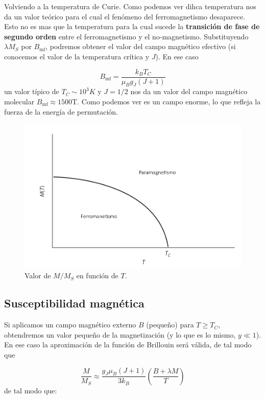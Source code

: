 \documentclass[12pt,a4paper]{book}
\numberwithin{equation}{section}
\numberwithin{figure}{section}
\newcommand{\parentesis}[1]{\left( #1  \right)}
\newcommand{\mf}{\mathrm{mf}}
\begin{document}
Volviendo a la temperatura de Curie. Como podemos ver dihca temperatura nos da un valor teórico para el cual el fenómeno del ferromagnetismo desaparece. Esto no es mas que la temperatura para la cual sucede la \textbf{transición de fase de segundo orden} entre el ferromagnetismo y el no-magnetismo. Substituyendo $\lambda M_S$ por $B_\mf$, podremos obtener el valor del campo magnético efectivo (si conocemos el valor de la temperatura crítica y $J$). En ese caso

\begin{equation}
    B_\mf = \frac{k_B T_C}{\mu_B g_J (J+1)}
\end{equation}
un valor típico de $T_C \sim 10^3K$ y $J=1/2$ nos da un valor del campo magnético molecular $B_\mf \approx 1500$T. Como podemos ver es un campo enorme, lo que refleja la fuerza de la energía de permutación. 

\begin{figure}[h!]
    \centering
    \includegraphics[scale=0.6]{05-Ferro.png}
    \caption{Valor de $M/M_S$ en función de $T$.}
    \label{Fig:05-01-02}
\end{figure}

\subsection{Susceptibilidad magnética}

Si aplicamos un campo magnético externo $B$ (pequeño) para $T\geq T_C$, obtendremos un valor pequeño de la magnetización (y lo que es lo mismo, $y\ll 1$). En ese caso la aproximación de la función de Brillouin será válida, de tal modo que

\begin{equation}
    \frac{M}{M_S} \approx \frac{g_J \mu_B (J+1)}{3k_B} \parentesis{\frac{B+\lambda M}{T}} 
\end{equation}
de tal modo que:
\end{document}
